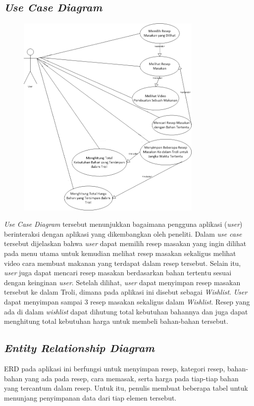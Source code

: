 	\subsection{\emph{Use Case Diagram}}
		\begin{figure}[H]
			\centering
			\includegraphics[origin=c,width=0.8\textwidth]{gambar/use-case/use_case_v2}
		\end{figure}
		\textit{Use Case Diagram} tersebut menunjukkan bagaimana pengguna aplikasi (\textit{user}) berinteraksi dengan aplikasi yang dikembangkan oleh peneliti. Dalam \textit{use case} tersebut dijelaskan bahwa \textit{user} dapat memilih resep masakan yang ingin dilihat pada menu utama untuk kemudian melihat resep masakan sekaligus melihat video cara membuat makanan yang terdapat dalam resep tersebut. Selain itu, \textit{user} juga dapat mencari resep masakan berdasarkan bahan tertentu sesuai dengan keinginan \textit{user}. Setelah dilihat, \textit{user} dapat menyimpan resep masakan tersebut ke dalam Troli, dimana pada aplikasi ini disebut sebagai \textit{Wishlist}. \textit{User} dapat menyimpan sampai 3 resep masakan sekaligus dalam \textit{Wishlist}. Resep yang ada di dalam \textit{wishlist} dapat dihutung total kebutuhan bahannya dan juga dapat menghitung total kebutuhan harga untuk membeli bahan-bahan tersebut.   
	\subsection{\emph{Entity Relationship Diagram}}
		ERD pada aplikasi ini berfungsi untuk menyimpan resep, kategori resep, bahan-bahan yang ada  pada resep, cara memasak, serta harga pada tiap-tiap bahan yang tercantum dalam resep. Untuk itu, penulis membuat beberapa tabel untuk menunjang penyimpanan data dari tiap elemen tersebut. 
		
